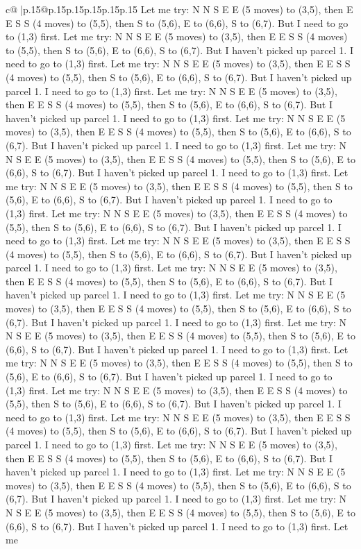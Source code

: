 \documentclass{article}
\begin{document}
{\begin{supertabular}{c@{$\;$}|p{.15\linewidth}@{}p{.15\linewidth}p{.15\linewidth}p{.15\linewidth}p{.15\linewidth}p{.15\linewidth}}
{{{Let me try: N N S E E (5 moves) to (3,5), then E E S S (4 moves) to (5,5), then S to (5,6), E to (6,6), S to (6,7). But I need to go to (1,3) first. Let me try: N N S E E (5 moves) to (3,5), then E E S S (4 moves) to (5,5), then S to (5,6), E to (6,6), S to (6,7). But I haven't picked up parcel 1. I need to go to (1,3) first. Let me try: N N S E E (5 moves) to (3,5), then E E S S (4 moves) to (5,5), then S to (5,6), E to (6,6), S to (6,7). But I haven't picked up parcel 1. I need to go to (1,3) first. Let me try: N N S E E (5 moves) to (3,5), then E E S S (4 moves) to (5,5), then S to (5,6), E to (6,6), S to (6,7). But I haven't picked up parcel 1. I need to go to (1,3) first. Let me try: N N S E E (5 moves) to (3,5), then E E S S (4 moves) to (5,5), then S to (5,6), E to (6,6), S to (6,7). But I haven't picked up parcel 1. I need to go to (1,3) first. Let me try: N N S E E (5 moves) to (3,5), then E E S S (4 moves) to (5,5), then S to (5,6), E to (6,6), S to (6,7). But I haven't picked up parcel 1. I need to go to (1,3) first. Let me try: N N S E E (5 moves) to (3,5), then E E S S (4 moves) to (5,5), then S to (5,6), E to (6,6), S to (6,7). But I haven't picked up parcel 1. I need to go to (1,3) first. Let me try: N N S E E (5 moves) to (3,5), then E E S S (4 moves) to (5,5), then S to (5,6), E to (6,6), S to (6,7). But I haven't picked up parcel 1. I need to go to (1,3) first. Let me try: N N S E E (5 moves) to (3,5), then E E S S (4 moves) to (5,5), then S to (5,6), E to (6,6), S to (6,7). But I haven't picked up parcel 1. I need to go to (1,3) first. Let me try: N N S E E (5 moves) to (3,5), then E E S S (4 moves) to (5,5), then S to (5,6), E to (6,6), S to (6,7). But I haven't picked up parcel 1. I need to go to (1,3) first. Let me try: N N S E E (5 moves) to (3,5), then E E S S (4 moves) to (5,5), then S to (5,6), E to (6,6), S to (6,7). But I haven't picked up parcel 1. I need to go to (1,3) first. Let me try: N N S E E (5 moves) to (3,5), then E E S S (4 moves) to (5,5), then S to (5,6), E to (6,6), S to (6,7). But I haven't picked up parcel 1. I need to go to (1,3) first. Let me try: N N S E E (5 moves) to (3,5), then E E S S (4 moves) to (5,5), then S to (5,6), E to (6,6), S to (6,7). But I haven't picked up parcel 1. I need to go to (1,3) first. Let me try: N N S E E (5 moves) to (3,5), then E E S S (4 moves) to (5,5), then S to (5,6), E to (6,6), S to (6,7). But I haven't picked up parcel 1. I need to go to (1,3) first. Let me try: N N S E E (5 moves) to (3,5), then E E S S (4 moves) to (5,5), then S to (5,6), E to (6,6), S to (6,7). But I haven't picked up parcel 1. I need to go to (1,3) first. Let me try: N N S E E (5 moves) to (3,5), then E E S S (4 moves) to (5,5), then S to (5,6), E to (6,6), S to (6,7). But I haven't picked up parcel 1. I need to go to (1,3) first. Let me try: N N S E E (5 moves) to (3,5), then E E S S (4 moves) to (5,5), then S to (5,6), E to (6,6), S to (6,7). But I haven't picked up parcel 1. I need to go to (1,3) first. Let me try: N N S E E (5 moves) to (3,5), then E E S S (4 moves) to (5,5), then S to (5,6), E to (6,6), S to (6,7). But I haven't picked up parcel 1. I need to go to (1,3) first. Let me }}}
\end{supertabular}}
\end{document}

